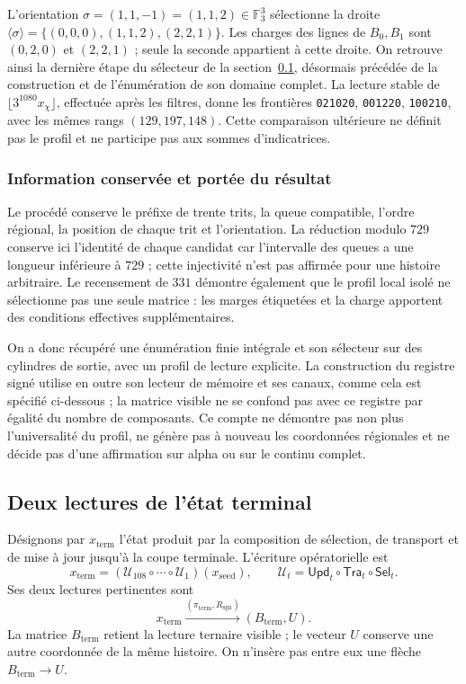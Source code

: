 L'orientation \(\sigma=(1,1,-1)=(1,1,2)\in\mathbb F_3^3\)
sélectionne la droite
\(\langle\sigma\rangle=\{(0,0,0),(1,1,2),(2,2,1)\}\).
Les charges des lignes de \(B_0,B_1\) sont \((0,2,0)\) et \((2,2,1)\) ;
seule la seconde appartient à cette droite. On retrouve ainsi la dernière étape
du sélecteur de la section~\ref{x_reciprocidad:subsec:k-terminal}, désormais précédée de
la construction et de l'énumération de son domaine complet. La lecture stable
de \(\lfloor3^{1080}x_\chi\rfloor\), effectuée après les filtres,
donne les frontières \texttt{021020}, \texttt{001220}, \texttt{100210},
avec les mêmes rangs \((129,197,148)\). Cette comparaison ultérieure ne définit
pas le profil et ne participe pas aux sommes d'indicatrices.

\subsubsection{Information conservée et portée du résultat}

Le procédé conserve le préfixe de trente trits, la queue compatible, l'ordre régional, la position de chaque trit et l'orientation. La réduction modulo \(729\) conserve ici l'identité de chaque candidat car l'intervalle des queues a une longueur inférieure à \(729\) ; cette injectivité n'est pas affirmée pour une histoire arbitraire. Le recensement de \(331\) démontre également que le profil local isolé ne sélectionne pas une seule matrice : les marges étiquetées et la charge apportent des conditions effectives supplémentaires.

On a donc récupéré une énumération finie intégrale et son sélecteur sur des cylindres de sortie, avec un profil de lecture explicite. La construction du registre signé utilise en outre son lecteur de mémoire et ses canaux, comme cela est spécifié ci-dessous ; la matrice visible ne se confond pas avec ce registre par égalité du nombre de composants. Ce compte ne démontre pas non plus l'universalité du profil, ne génère pas à nouveau les coordonnées régionales et ne décide pas d'une affirmation sur alpha ou sur le continu complet.



\subsection{Deux lectures de l'état terminal}
\label{x_reciprocidad:subsec:k-terminal}

Désignons par \(x_{\mathrm{term}}\) l'état produit par la composition de sélection, de transport et de mise à jour jusqu'à la coupe terminale. L'écriture opératorielle est
\[
 x_{\mathrm{term}}=
 (\mathcal U_{108}\circ\cdots\circ\mathcal U_1)(x_{\mathrm{seed}}),
 \qquad \mathcal U_t=\mathsf{Upd}_t\circ\mathsf{Tra}_t\circ\mathsf{Sel}_t.
\]
Ses deux lectures pertinentes sont
\[
 x_{\mathrm{term}}
 \xrightarrow{(\pi_{\mathrm{term}},R_{\mathrm{sgn}})}
 (B_{\mathrm{term}},U).
\]
La matrice \(B_{\mathrm{term}}\) retient la lecture ternaire visible ; le vecteur \(U\) conserve une autre coordonnée de la même histoire. On n'insère pas entre eux une flèche \(B_{\mathrm{term}}\to U\).

